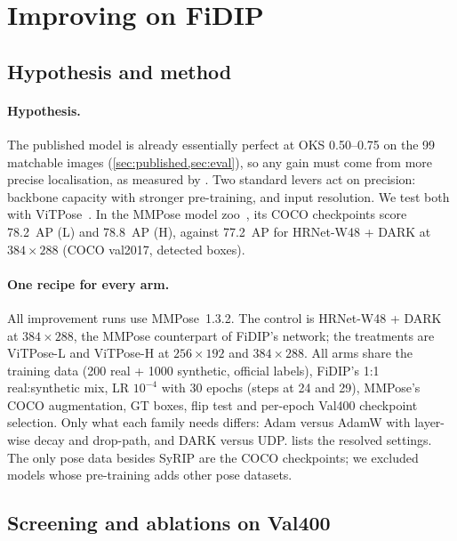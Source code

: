\section{Improving on FiDIP}\label{sec:improve}

\subsection{Hypothesis and method}\label{sec:method}

\paragraph{Hypothesis.} The published model is already essentially perfect at OKS 0.50--0.75 on the 99 matchable images (\cref{sec:published,sec:eval}), so any gain must come from more precise localisation, as measured by \APstrict{}.
Two standard levers act on precision: backbone capacity with stronger pre-training, and input resolution.
We test both with ViTPose~\citep{xu2022vitpose}. In the MMPose model zoo~\citep{mmpose2020}, its COCO checkpoints score 78.2~AP (L) and 78.8~AP (H), against 77.2~AP for HRNet-W48 + DARK at $384{\times}288$ (COCO val2017, detected boxes).

\paragraph{One recipe for every arm.} All improvement runs use MMPose~1.3.2.
The control is HRNet-W48 + DARK at $384{\times}288$, the MMPose counterpart of FiDIP's network; the treatments are ViTPose-L and ViTPose-H at $256{\times}192$ and $384{\times}288$.
All arms share the training data (200 real + 1000 synthetic, official labels), FiDIP's 1:1 real:synthetic mix, LR $10^{-4}$ with 30 epochs (steps at 24 and 29), MMPose's COCO augmentation, GT boxes, flip test and per-epoch Val400 checkpoint selection. Only what each family needs differs: Adam versus AdamW with layer-wise decay and drop-path, and DARK versus UDP.
 lists the resolved settings. The only pose data besides SyRIP are the COCO checkpoints; we excluded models whose pre-training adds other pose datasets.

\subsection{Screening and ablations on Val400}\label{sec:backbone}\label{sec:ablations}

